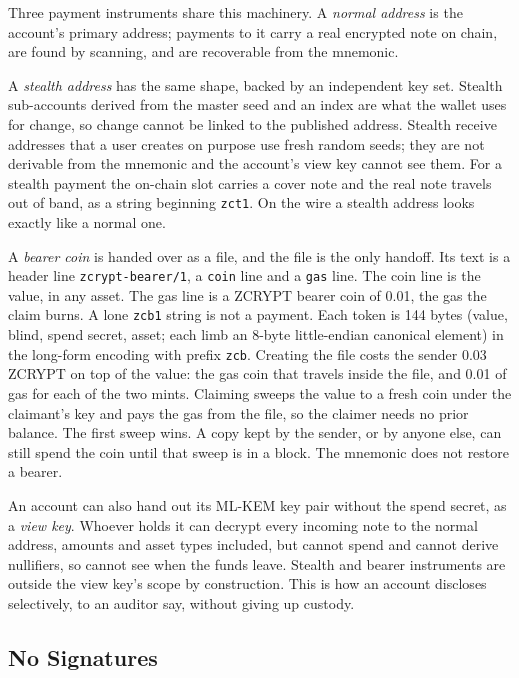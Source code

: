 \documentclass[twocolumn,10pt]{article}
\begin{document}
Three payment instruments share this machinery. A \emph{normal address} is the account's primary address; payments to it carry a real encrypted note on chain, are found by scanning, and are recoverable from the mnemonic.

A \emph{stealth address} has the same shape, backed by an independent key set. Stealth sub-accounts derived from the master seed and an index are what the wallet uses for change, so change cannot be linked to the published address. Stealth receive addresses that a user creates on purpose use fresh random seeds; they are not derivable from the mnemonic and the account's view key cannot see them. For a stealth payment the on-chain slot carries a cover note and the real note travels out of band, as a string beginning \texttt{zct1}. On the wire a stealth address looks exactly like a normal one.

A \emph{bearer coin} is handed over as a file, and the file is the only handoff. Its text is a header line \texttt{zcrypt-bearer/1}, a \texttt{coin} line and a \texttt{gas} line. The coin line is the value, in any asset. The gas line is a ZCRYPT bearer coin of 0.01, the gas the claim burns. A lone \texttt{zcb1} string is not a payment. Each token is 144 bytes (value, blind, spend secret, asset; each limb an 8-byte little-endian canonical element) in the long-form encoding with prefix \texttt{zcb}. Creating the file costs the sender 0.03 ZCRYPT on top of the value: the gas coin that travels inside the file, and 0.01 of gas for each of the two mints. Claiming sweeps the value to a fresh coin under the claimant's key and pays the gas from the file, so the claimer needs no prior balance. The first sweep wins. A copy kept by the sender, or by anyone else, can still spend the coin until that sweep is in a block. The mnemonic does not restore a bearer.

An account can also hand out its ML-KEM key pair without the spend secret, as a \emph{view key}. Whoever holds it can decrypt every incoming note to the normal address, amounts and asset types included, but cannot spend and cannot derive nullifiers, so cannot see when the funds leave. Stealth and bearer instruments are outside the view key's scope by construction. This is how an account discloses selectively, to an auditor say, without giving up custody.

\subsection{No Signatures}
\label{sec:nosig}
\end{document}
